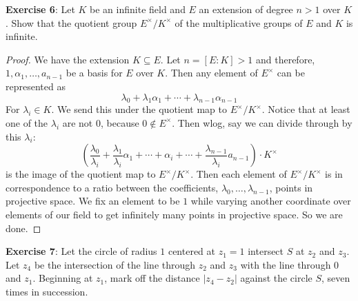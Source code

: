 \documentclass{article}
\begin{document}
\textbf{Exercise 6}: Let $K$ be an infinite field and $E$ an extension of degree $n > 1$ over $K$. Show that the quotient group $E^{\times}/K^{\times}$ of the multiplicative groups of $E$ and $K$ is infinite. 
    \begin{proof}
        We have the extension $K \subseteq E$. Let $n = [E : K] > 1$ and therefore, $1, \alpha_{1}, \ldots, a_{n - 1}$ be a basis for $E$ over $K$. Then any element of $E^{\times}$ can be represented as
            \begin{equation*}
                \lambda_{0} + \lambda_{1}\alpha_{1} + \cdots + \lambda_{n - 1}\alpha_{n - 1}
            \end{equation*}
        For $\lambda_{i} \in K$. We send this under the quotient map to $E^{\times}/K^{\times}$. Notice that at least one of the $\lambda_{i}$ are not $0$, because $0  \notin E^{\times}$. Then wlog, say we can divide through by this $\lambda_{i}$:
            \begin{equation*}
                \left(\dfrac{\lambda_{0}}{\lambda_{i}} + \dfrac{\lambda_{1}}{\lambda_{i}}\alpha_{1} + \cdots +  \alpha_{i} + \cdots + \dfrac{\lambda_{n - 1}}{\lambda_{i}}a_{n - 1}\right) \cdot K^{\times}
            \end{equation*}
        is the image of the quotient map to $E^{\times}/K^{\times}$. Then each element of $E^{\times}/K^{\times}$ is in correspondence to a ratio between the coefficients, $\lambda_{0}, \ldots, \lambda_{n - 1}$, points in projective space. We fix an element to be $1$ while varying another coordinate over elements of our field to get infinitely many points in projective space. So we are done.
    \end{proof}

\textbf{Exercise 7}: Let the circle of radius $1$ centered at $z_{1} = 1$ intersect $S$ at $z_{2}$ and $z_{3}$. Let $z_{4}$ be the intersection of the line through $z_{2}$ and $z_{3}$ with the line through $0$ and $z_{1}$. Beginning at $z_{1}$, mark off the distance $\lvert z_{4} - z_{2} \rvert$ against the circle $S$, seven times in succession.
\end{document}
